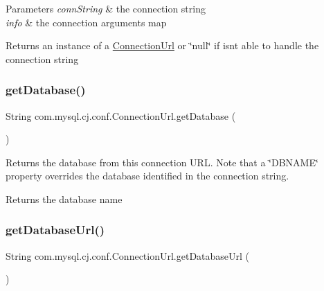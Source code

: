 \begin{DoxyParams}{Parameters}
{\em conn\+String} & the connection string \\
\hline
{\em info} & the connection arguments map \\
\hline
\end{DoxyParams}
\begin{DoxyReturn}{Returns}
an instance of a \mbox{\hyperlink{classcom_1_1mysql_1_1cj_1_1conf_1_1_connection_url}{Connection\+Url}} or \char`\"{}null\char`\"{} if isn\textquotesingle{}t able to handle the connection string 
\end{DoxyReturn}
\mbox{\label{classcom_1_1mysql_1_1cj_1_1conf_1_1_connection_url_abdfbf97b8d787783473d36722cfae81a}} 
\subsubsection{\texorpdfstring{get\+Database()}{getDatabase()}}
{\footnotesize\ttfamily String com.\+mysql.\+cj.\+conf.\+Connection\+Url.\+get\+Database (\begin{DoxyParamCaption}{ }\end{DoxyParamCaption})}

Returns the database from this connection U\+RL. Note that a \char`\"{}\+D\+B\+N\+A\+M\+E\char`\"{} property overrides the database identified in the connection string.

\begin{DoxyReturn}{Returns}
the database name 
\end{DoxyReturn}
\mbox{\label{classcom_1_1mysql_1_1cj_1_1conf_1_1_connection_url_a574945f907f1b2aadd0f056e0e240bbf}} 
\subsubsection{\texorpdfstring{get\+Database\+Url()}{getDatabaseUrl()}}
{\footnotesize\ttfamily String com.\+mysql.\+cj.\+conf.\+Connection\+Url.\+get\+Database\+Url (\begin{DoxyParamCaption}{ }\end{DoxyParamCaption})}

